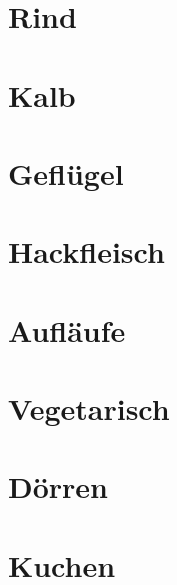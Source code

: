 \renewcommand\x{1} %

\tableofcontents



\part{Rind}



\part{Kalb}


\part{Geflügel}


\part{Hackfleisch}


\part{Aufläufe}


\part{Vegetarisch}


\part{Dörren}


\part{Kuchen}


